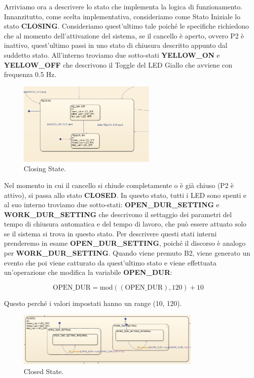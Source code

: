 \documentclass[12pt]{article}
\begin{document}
Arriviamo ora a descrivere lo stato che implementa la logica di funzionamento. Innanzitutto, come scelta implementativa, consideriamo come Stato Iniziale lo stato \textbf{CLOSING}. Consideriamo quest'ultimo tale poiché le specifiche richiedono che al momento dell'attivazione del sistema, se il cancello è aperto, ovvero P2 è inattivo, quest'ultimo passi in uno stato di chiusura descritto appunto dal suddetto stato. All'interno troviamo due sotto-stati \textbf{YELLOW\_ON} e \textbf{YELLOW\_OFF} che descrivono il Toggle del LED Giallo che avviene con frequenza 0.5 Hz.

\begin{figure}[H]
    \centering
    \includegraphics[width=0.6\textwidth]{imm/Closing.png}
    \caption{Closing State.}
\end{figure}

\noindent Nel momento in cui il cancello si chiude completamente o è già chiuso (P2 è attivo), si passa allo stato \textbf{CLOSED}. In questo stato, tutti i LED sono spenti e al suo interno troviamo due sotto-stati: \textbf{OPEN\_DUR\_SETTING} e \textbf{WORK\_DUR\_SETTING} che descrivono il settaggio dei parametri del tempo di chiusura automatica e del tempo di lavoro, che può essere attuato solo se il sistema si trova in questo stato. Per descrivere questi stati interni prenderemo in esame \textbf{OPEN\_DUR\_SETTING}, poiché il discorso è analogo per \textbf{WORK\_DUR\_SETTING}. Quando viene premuto B2, viene generato un evento che poi viene catturato da quest'ultimo stato e viene effettuata un'operazione che modifica la variabile \textbf{OPEN\_DUR}: 

\[
\mathrm{OPEN\_DUR} = \mathrm{mod}((\mathrm{OPEN\_DUR}), 120) + 10
\]

Questo perché i valori impostati hanno un range (10, 120).

\begin{figure}[H]
    \centering
    \includegraphics[width=0.8\textwidth]{imm/Closed.png}
    \caption{Closed State.}
\end{figure}
\end{document}
